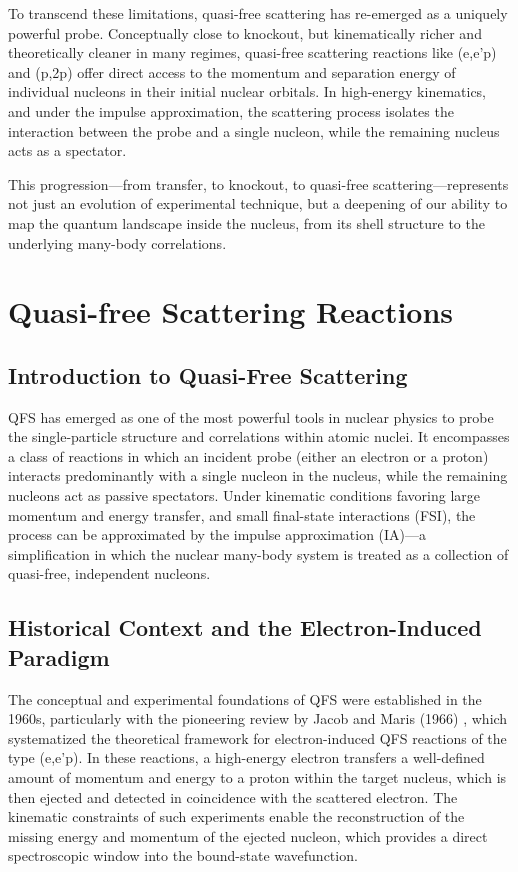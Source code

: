 To transcend these limitations, quasi-free scattering has re-emerged as a uniquely powerful probe. Conceptually close to knockout, but kinematically richer and theoretically cleaner in many regimes, quasi-free scattering reactions like (e,e'p) and (p,2p) offer direct access to the momentum and separation energy of individual nucleons in their initial nuclear orbitals. In high-energy kinematics, and under the impulse approximation, the scattering process isolates the interaction between the probe and a single nucleon, while the remaining nucleus acts as a spectator.

This progression—from transfer, to knockout, to quasi-free scattering—represents not just an evolution of experimental technique, but a deepening of our ability to map the quantum landscape inside the nucleus, from its shell structure to the underlying many-body correlations.


\section{Quasi-free Scattering Reactions}

\subsection{Introduction to Quasi-Free Scattering}

\gls{QFS} has emerged as one of the most powerful tools in nuclear physics to probe the single-particle structure and correlations within atomic nuclei. It encompasses a class of reactions in which an incident probe (either an electron or a proton) interacts predominantly with a single nucleon in the nucleus, while the remaining nucleons act as passive spectators. Under kinematic conditions favoring large momentum and energy transfer, and small final-state interactions (FSI), the process can be approximated by the impulse approximation (IA)—a simplification in which the nuclear many-body system is treated as a collection of quasi-free, independent nucleons.


\subsection{Historical Context and the Electron-Induced Paradigm}

The conceptual and experimental foundations of \gls{QFS} were established in the 1960s, particularly with the pioneering review by Jacob and Maris (1966) \cite{jacob_quasi-free_1966}, which systematized the theoretical framework for electron-induced \gls{QFS} reactions of the type (e,e'p). In these reactions, a high-energy electron transfers a well-defined amount of momentum and energy to a proton within the target nucleus, which is then ejected and detected in coincidence with the scattered electron. The kinematic constraints of such experiments enable the reconstruction of the missing energy and momentum of the ejected nucleon, which provides a direct spectroscopic window into the bound-state wavefunction.


